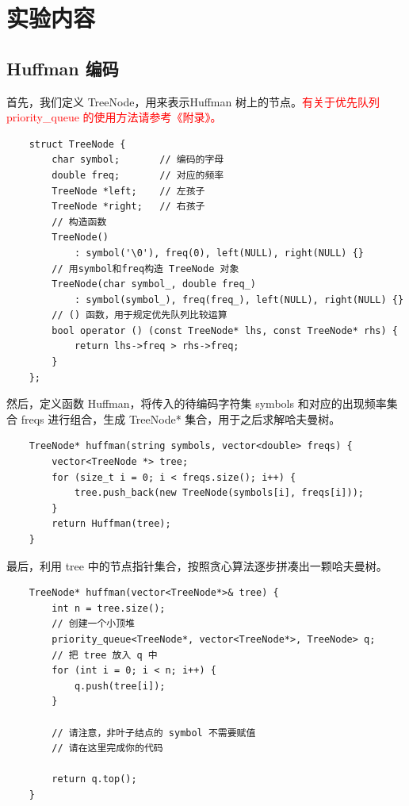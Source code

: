 \documentclass[12pt,a4paper]{article}
\begin{document}
\section{实验内容}

\subsection{Huffman 编码}

首先，我们定义 TreeNode，用来表示Huffman 树上的节点。\textcolor{red}{有关于优先队列 priority\_queue 的使用方法请参考《附录》。}
\begin{lstlisting}
    struct TreeNode {
        char symbol;       // 编码的字母
        double freq;       // 对应的频率
        TreeNode *left;    // 左孩子
        TreeNode *right;   // 右孩子
        // 构造函数
        TreeNode()
            : symbol('\0'), freq(0), left(NULL), right(NULL) {}
        // 用symbol和freq构造 TreeNode 对象
        TreeNode(char symbol_, double freq_)
            : symbol(symbol_), freq(freq_), left(NULL), right(NULL) {}
        // () 函数，用于规定优先队列比较运算
        bool operator () (const TreeNode* lhs, const TreeNode* rhs) {
            return lhs->freq > rhs->freq;
        }
    };
\end{lstlisting}

然后，定义函数 Huffman，将传入的待编码字符集 symbols 和对应的出现频率集合 freqs 进行组合，生成 TreeNode* 集合，用于之后求解哈夫曼树。
\begin{lstlisting}
    TreeNode* huffman(string symbols, vector<double> freqs) {
        vector<TreeNode *> tree;
        for (size_t i = 0; i < freqs.size(); i++) {
            tree.push_back(new TreeNode(symbols[i], freqs[i]));
        }
        return Huffman(tree);
    }
\end{lstlisting}

最后，利用 tree 中的节点指针集合，按照贪心算法逐步拼凑出一颗哈夫曼树。

\begin{lstlisting}
    TreeNode* huffman(vector<TreeNode*>& tree) {
        int n = tree.size();
        // 创建一个小顶堆
        priority_queue<TreeNode*, vector<TreeNode*>, TreeNode> q;
        // 把 tree 放入 q 中
        for (int i = 0; i < n; i++) {
            q.push(tree[i]);
        }
    
        // 请注意，非叶子结点的 symbol 不需要赋值
        // 请在这里完成你的代码
    
        return q.top();
    }
\end{lstlisting}
\end{document}
